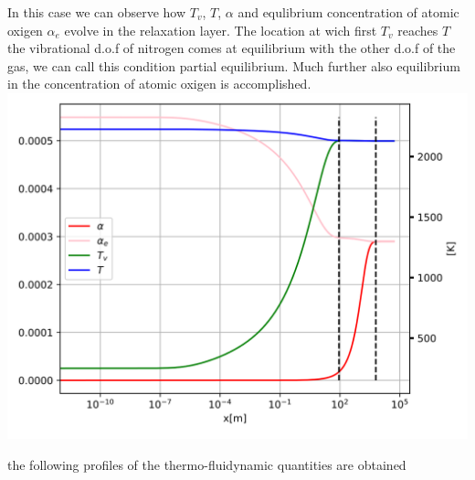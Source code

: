 \documentclass[
]{article}
\begin{document}
In this case we can observe how \(T_v\), \(T\), \(\alpha\) and
equlibrium concentration of atomic oxigen \(\alpha_e\) evolve in the
relaxation layer. The location at wich first \(T_v\) reaches \(T\) the
vibrational d.o.f of nitrogen comes at equilibrium with the other d.o.f
of the gas, we can call this condition partial equilibrium. Much further
also equilibrium in the concentration of atomic oxigen is
accomplished.\\
\includegraphics{images/40km/NequilibriumFlowNSW_T_alpha.svg}

the following profiles of the thermo-fluidynamic quantities are obtained
\end{document}
